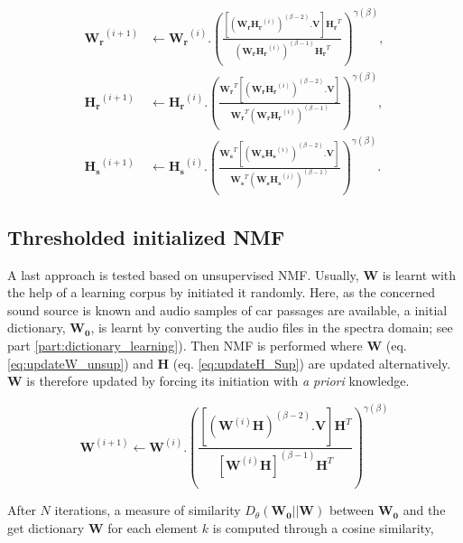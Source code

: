 \documentclass[twocolumn,a4paper,10pt]{article}
\begin{document}
{\scriptsize
\begin{subequations}\label{eq:WH-SSupdate}
\begin{align}
\mathbf{W_r}^{(i+1)} &\leftarrow \mathbf{W_r}^{(i)}.\left(\frac{\left[\left(\mathbf{W_r H_r}^{(i)} \right)^{(\beta-2)}.\mathbf{V} \right]\mathbf{H_r}^T}{\left(\mathbf{W_r H_r}^{(i)} \right)^{(\beta-1)}\mathbf{H_r}^T}\right)^{\gamma(\beta)}, \label{eq:W_r_SS}\\
\mathbf{H_r}^{(i+1)} &\leftarrow \mathbf{H_r}^{(i)}.\left(\frac{\mathbf{W_r}^T \left[\left(\mathbf{W_r H_r}^{(i)} \right)^{(\beta-2)}.\mathbf{V} \right]}{\mathbf{W_r}^T \left(\mathbf{W_r H_r}^{(i)} \right)^{(\beta-1)}}\right)^{\gamma(\beta)}, \label{eq:H_r_SS}\\
\mathbf{H_s}^{(i+1)} &\leftarrow \mathbf{H_s}^{(i)}.\left(\frac{\mathbf{W_s}^T \left[\left(\mathbf{W_s H_s}^{(i)} \right)^{(\beta-2)}.\mathbf{V} \right]}{\mathbf{W_s}^T \left(\mathbf{W_s H_s}^{(i)} \right)^{(\beta-1)}}\right)^{\gamma(\beta)}.\label{eq:H_s_SS}
\end{align}
\end{subequations}}

\subsection{Thresholded initialized NMF}

A last approach is tested based on unsupervised NMF. Usually, $\mathbf{W}$ is learnt with the help of a learning corpus by initiated it randomly. Here, as the concerned sound source is known and audio samples of car passages are available, a initial dictionary, $\mathbf{W_0}$, is learnt by converting the audio files in the spectra domain; see part \ref{part:dictionary_learning}). Then NMF is performed where $\mathbf{W}$ (eq. \ref{eq:updateW_unsup}) and $\mathbf{H}$ (eq.  \ref{eq:updateH_Sup}) are updated alternatively. $\mathbf{W}$ is therefore updated by forcing its initiation with \textit{a priori} knowledge.

\begin{equation}\label{eq:updateW_unsup}
\textbf{W}^{(i+1)} \leftarrow \mathbf{W}^{(i)}.\left(\frac{\left[\left(\mathbf{W}^{(i)}\mathbf{H} \right)^{(\beta-2)}.\mathbf{V} \right]\mathbf{H}^T}{\left[\mathbf{W}^{(i)}\mathbf{H} \right]^{(\beta-1)}\mathbf{H}^T}\right)^{\gamma(\beta)}
\end{equation}

After $N$ iterations, a measure of similarity $D_{\theta}\left(\mathbf{W_0} \vert \vert \mathbf{W} \right)$ between $\mathbf{W_0}$ and the get dictionary $\mathbf{W}$ for each element $k$ is computed through a cosine similarity,
\end{document}
